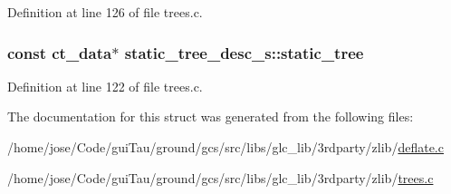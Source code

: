 Definition at line 126 of file trees.\-c.

\hypertarget{structstatic__tree__desc__s_a56265073858de4ffe99e32d0f9d38545}{
\subsubsection[{static\-\_\-tree}]{\setlength{\rightskip}{0pt plus 5cm}const {\bf ct\-\_\-data}$\ast$ static\-\_\-tree\-\_\-desc\-\_\-s\-::static\-\_\-tree}}\label{structstatic__tree__desc__s_a56265073858de4ffe99e32d0f9d38545}


Definition at line 122 of file trees.\-c.



The documentation for this struct was generated from the following files\-:\begin{DoxyCompactItemize}
\item 
/home/jose/\-Code/gui\-Tau/ground/gcs/src/libs/glc\-\_\-lib/3rdparty/zlib/\hyperlink{deflate_8c}{deflate.\-c}\item 
/home/jose/\-Code/gui\-Tau/ground/gcs/src/libs/glc\-\_\-lib/3rdparty/zlib/\hyperlink{trees_8c}{trees.\-c}\end{DoxyCompactItemize}
